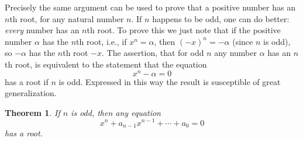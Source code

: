 \documentclass{article}
\newtheorem{theorem}{Theorem}
\begin{document}
Precisely the same argument can be used to prove that a positive number has an
$n$th root, for any natural number $n$. If $n$ happens to be odd, one can do
better: \emph{every} number has an $n$th root. To prove this we just note that
if the positive number $\alpha$ has the $n$th root, i.e., if $x^n = \alpha$,
then $(-x)^n = -\alpha$ (since $n$ is odd), so $-\alpha$ has the $n$th root
$-x$. The assertion, that for odd $n$ any number $\alpha$ has an $n$th root,
is equivalent to the statement that the equation \begin{equation*}
  x^n - \alpha = 0
\end{equation*}
has a root if $n$ is odd. Expressed in this way the result is susceptible of
great generalization.

\begin{theorem}
  If $n$ is odd, then any equation \begin{equation*}
    x^n + a_{n-1}x^{n-1} + \cdots + a_0 = 0
  \end{equation*}
  has a root.
\end{theorem}
\end{document}
